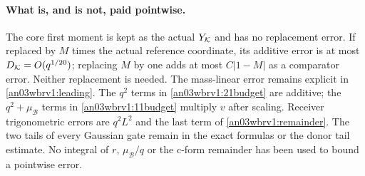 \documentclass[11pt]{article}
\numberwithin{equation}{section}
\theoremstyle{remark}\newtheorem{remark}[theorem]{Remark}
\newcommand{\BB}{\mathcal B}\newcommand{\Gp}{{G_+}}
\begin{document}
\paragraph{What is, and is not, paid pointwise.}
The core first moment is kept as the actual $Y_\mathcal K$ and has no
replacement error. If replaced by $M$ times the actual reference
coordinate, its additive error is at most $D_\mathcal K=O(q^{1/20})$;
replacing $M$ by one adds at most $C|1-M|$ as a comparator error.
Neither replacement is needed. The mass-linear error remains explicit
in \eqref{an03wbrv1:leading}. The $q^2$ terms in
\eqref{an03wbrv1:21budget} are additive; the $q^2+\mu_\BB$ terms
in \eqref{an03wbrv1:11budget} multiply $v$ after scaling. Receiver
trigonometric errors are $q^2L^2$ and the last term of
\eqref{an03wbrv1:remainder}. The two tails of every Gaussian gate
remain in the exact formulas or the donor tail estimate. No integral
of $r$, $\mu_\BB/q$ or the c-form remainder has been used to bound
a pointwise error.
\end{document}

